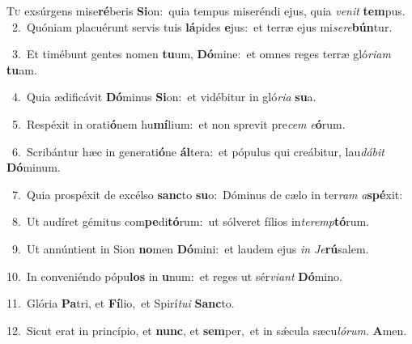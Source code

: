 \lettrine{\initial\textcolor{\initialcolor}{T}}{u} exsúrgens mise\-\textbf{ré}\-beris \textbf{Si}\-on:~\star quia tempus miseréndi ejus, quia \textit{ve}\-\textit{nit} \textbf{tem}\-pus.\\
{\numbfont\textcolor{\numbcolor}{~2.}}~Quóniam placuérunt servis tuis \textbf{lá}\-pides \textbf{e}\-jus:~\star et terræ ejus mi\-\textit{se}\-\textit{re}\textbf{bún}tur.\par
{\numbfont\textcolor{\numbcolor}{~3.}}~Et timébunt gentes nomen \textbf{tu}\-um, \textbf{Dó}\-mine:~\star et omnes reges terræ gló\-\textit{ri}\-\textit{am} \textbf{tu}\-am.\par
{\numbfont\textcolor{\numbcolor}{~4.}}~Quia ædificávit \textbf{Dó}\-minus \textbf{Si}\-on:~\star et vidébitur in gló\-\textit{ri}\-\textit{a} \textbf{su}\-a.\par
{\numbfont\textcolor{\numbcolor}{~5.}}~Respéxit in orati\-\textbf{ó}\-nem hu\-\textbf{mí}\-lium:~\star et non sprevit pre\textit{cem} \textit{e}\-\textbf{ó}rum.\par
{\numbfont\textcolor{\numbcolor}{~6.}}~Scribántur hæc in generati\-\textbf{ó}\-ne \textbf{ál}\-tera:~\star et pópulus qui creábitur, lau\-\textit{dá}\-\textit{bit} \textbf{Dó}\-minum.\par
{\numbfont\textcolor{\numbcolor}{~7.}}~Quia prospéxit de excélso \textbf{sanc}\-to \textbf{su}\-o:~\star Dóminus de cælo in ter\textit{ram} \textit{a}\-\textbf{spé}xit:\par
{\numbfont\textcolor{\numbcolor}{~8.}}~Ut audíret gémitus com\-\textbf{pe}\-di\-\textbf{tó}\-rum:~\star ut sólveret fílios in\-\textit{ter}\-\textit{emp}\textbf{tó}rum.\par
{\numbfont\textcolor{\numbcolor}{~9.}}~Ut annúntient in Sion \textbf{no}\-men \textbf{Dó}\-mini:~\star et laudem ejus \textit{in} \textit{Je}\-\textbf{rú}salem.\par
{\numbfont\textcolor{\numbcolor}{10.}}~In conveniéndo pópu\textbf{los} in \textbf{u}\-num:~\star et reges ut sér\-\textit{vi}\-\textit{ant} \textbf{Dó}\-mino.\par
{\numbfont\textcolor{\numbcolor}{11.}}~Glória \textbf{Pa}\-tri, et \textbf{Fí}\-lio,~\star et Spirí\-\textit{tu}\-\textit{i} \textbf{Sanc}\-to.\par
{\numbfont\textcolor{\numbcolor}{12.}}~Sicut erat in princípio, et \textbf{nunc}\-, et \textbf{sem}\-per,~\star et in sǽcula sæcu\-\textit{ló}\-\textit{rum}. \textbf{A}\-men.\par
